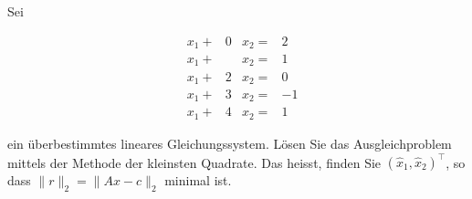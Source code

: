 \vspace{1cm}

\subsubsection{} %

Sei 

\begin{equation*}
    \begin{aligned}
        &x_1 +& 0&x_2 =& 2\\
        &x_1 +&  &x_2 =& 1\\
        &x_1 +& 2&x_2 =& 0\\
        &x_1 +& 3&x_2 =& -1\\
        &x_1 +& 4&x_2 =& 1 
    \end{aligned}
\end{equation*}

ein überbestimmtes lineares Gleichungssystem. Lösen Sie das Ausgleichproblem mittels der Methode der kleinsten Quadrate. Das heisst, finden Sie \( (\hat{x}_1,\hat{x}_2)^\top \), so dass \( \|r\|_2 = \|Ax-c\|_2 \) minimal ist.

\vspace{1\baselineskip}

